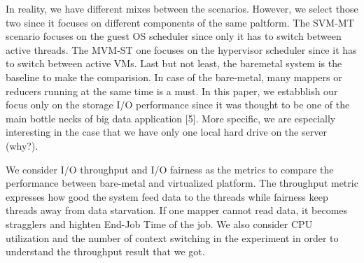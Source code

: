 \documentclass{acmsig}
\begin{document}
In reality, we have different mixes between the scenarios. However, we select those two since it focuses on different components of the same paltform. The SVM-MT scenario focuses on the guest OS scheduler since only it has to switch between active threads. The MVM-ST one focuses on the hypervisor scheduler since it has to switch between active VMs. Last but not least, the baremetal system is the baseline to make the comparision. In case of the bare-metal, many mappers or reducers running at the same time is a must. In this paper, we estabblish our focus only on the storage I/O performance since it was thought to be one of the main bottle necks of big data application [5]. More specific, we are especially interesting in the case that we have only one local hard drive on the server (why?). 

We consider I/O throughput and I/O fairness as the metrics to compare the performance between bare-metal and virtualized platform. The throughput metric expresses how good the system feed data to the threads while fairness keep threads away from data starvation. If one mapper cannot read data, it becomes stragglers and highten End-Job Time of the job. We also consider CPU utilization and the number of context switching in the experiment in order to understand the throughput result that we got.

\end{document}
